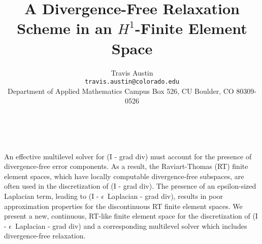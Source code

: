 \documentclass[11pt]{article}
\date{ ~ \hspace{-4mm}}
\title{A Divergence-Free Relaxation Scheme in an $H^1$-Finite Element Space  }
\author{Travis Austin \\ {\tt  travis.austin@colorado.edu} \\ Department of Applied Mathematics       Campus Box 526, CU Boulder, CO 80309-0526}
\begin{document}
\maketitle
\thispagestyle{empty}





 



An effective multilevel solver for (I - grad div) must account for the
presence of divergence-free error components.  As a result, the Raviart-Thomas
(RT) finite element spaces, which have locally computable divergence-free 
subspaces, are often used in the discretization of (I - grad div).  
The presence of an epsilon-sized Laplacian term, leading to
(I - $\epsilon$~Laplacian - grad div),
results in poor approximation properties for the
discontinuous RT finite element spaces.  We present a new, 
continuous, RT-like finite element space for the discretization of 
(I - $\epsilon$~Laplacian - grad div)
and a corresponding multilevel solver which 
includes divergence-free relaxation.
\end{document}
